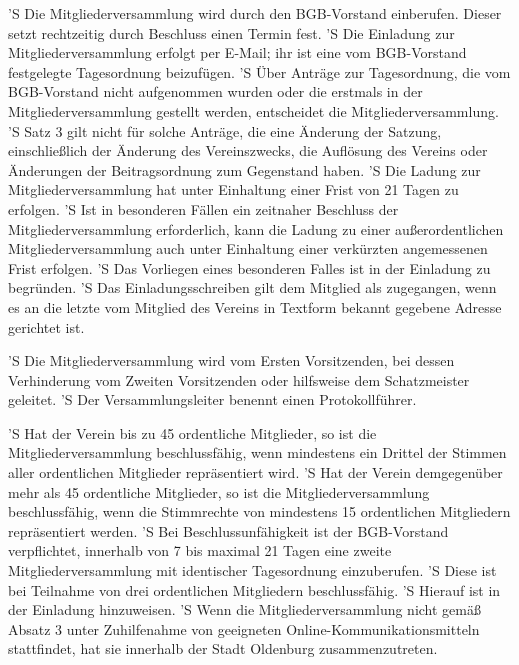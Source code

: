 \documentclass[a4paper,10pt]{scrreprt}
\begin{document}
\begin{contract}
'S Die Mitgliederversammlung wird durch den BGB-Vorstand einberufen. Dieser setzt
rechtzeitig durch Beschluss einen Termin fest.
'S Die Einladung zur Mitgliederversammlung erfolgt per E-Mail; ihr ist eine vom
BGB-Vorstand festgelegte Tagesordnung beizufügen.
'S Über Anträge zur Tagesordnung, die vom BGB-Vorstand nicht aufgenommen wurden
oder die erstmals in der Mitgliederversammlung gestellt werden, entscheidet die
Mitgliederversammlung.
'S Satz 3 gilt nicht für solche Anträge, die eine Änderung der Satzung,
einschließlich der Änderung des Vereinszwecks, die Auflösung des Vereins oder
Änderungen der Beitragsordnung zum Gegenstand haben.
'S Die Ladung zur Mitgliederversammlung hat unter Einhaltung einer Frist von 21
Tagen zu erfolgen.
'S Ist in besonderen Fällen ein zeitnaher Beschluss der Mitgliederversammlung
erforderlich, kann die Ladung zu einer außerordentlichen Mitgliederversammlung
auch unter Einhaltung einer verkürzten angemessenen Frist erfolgen.
'S Das Vorliegen eines besonderen Falles ist in der Einladung zu begründen.
'S Das Einladungsschreiben gilt dem Mitglied als zugegangen, wenn es an die
letzte vom Mitglied des Vereins in Textform bekannt gegebene Adresse gerichtet
ist.

'S Die Mitgliederversammlung wird vom Ersten Vorsitzenden, bei dessen
Verhinderung vom Zweiten Vorsitzenden oder hilfsweise dem Schatzmeister
geleitet.
'S Der Versammlungsleiter benennt einen Protokollführer.

'S Hat der Verein bis zu 45 ordentliche Mitglieder, so ist die
Mitgliederversammlung beschlussfähig, wenn mindestens ein Drittel der Stimmen
aller ordentlichen Mitglieder repräsentiert wird.
'S Hat der Verein demgegenüber mehr als 45 ordentliche Mitglieder, so ist die
Mitgliederversammlung beschlussfähig, wenn die Stimmrechte von mindestens 15
ordentlichen Mitgliedern repräsentiert werden.
'S Bei Beschlussunfähigkeit ist der BGB-Vorstand verpflichtet, innerhalb von 7
bis maximal 21 Tagen eine zweite Mitgliederversammlung mit identischer Tagesordnung
einzuberufen.
'S Diese ist bei Teilnahme von drei ordentlichen Mitgliedern beschlussfähig.
'S Hierauf ist in der Einladung hinzuweisen.
'S Wenn die Mitgliederversammlung nicht gemäß Absatz 3 unter Zuhilfenahme von
geeigneten Online-Kommunikationsmitteln stattfindet, hat sie innerhalb der
Stadt Oldenburg zusammenzutreten.


\end{contract}
\end{document}

